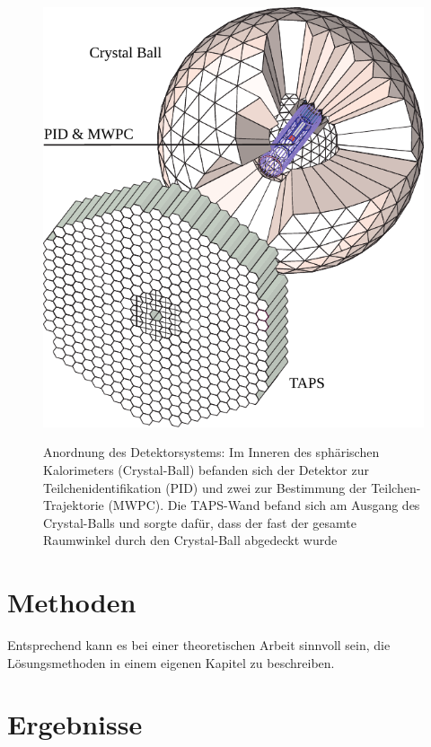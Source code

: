 \documentclass[a4paper,11pt,oneside,final,german,openbib,pdftex]{scrbook}
\begin{document}
\begin{figure}[h]
	\begin{center}
		\includegraphics{crystal_ball}
		\label{[fig.crystal_ball]}
		\caption{Anordnung des Detektorsystems: Im Inneren des sph\"arischen Kalorimeters (Crystal-Ball) befanden sich der Detektor zur Teilchenidentifikation (PID) und zwei zur Bestimmung der Teilchen-Trajektorie (MWPC). Die TAPS-Wand befand sich am Ausgang des Crystal-Balls und sorgte daf\"ur, dass der fast der gesamte Raumwinkel durch den Crystal-Ball abgedeckt wurde}
	\end{center}
\end{figure}

\section{Methoden}

Entsprechend kann es bei einer theoretischen Arbeit sinnvoll sein,
die L\"osungsmethoden in einem eigenen Kapitel zu beschreiben.

\section{Ergebnisse}
\end{document}
